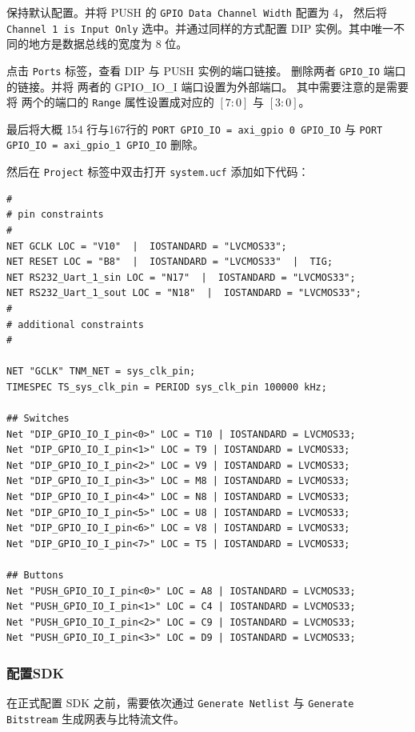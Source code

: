 \documentclass{ctexart}
\begin{document}
        保持默认配置。并将 PUSH 的 \verb|GPIO Data Channel Width| 配置为 4，
        然后将 \verb|Channel 1 is Input Only| 选中。并通过同样的方式配置 DIP
        实例。其中唯一不同的地方是数据总线的宽度为 8 位。

        点击 \verb|Ports| 标签，查看 DIP 与 PUSH 实例的端口链接。
        删除两者 \verb|GPIO_IO| 端口的链接。并将 两者的 GPIO_IO_I 端口设置为外部端口。
        其中需要注意的是需要将 两个的端口的 \verb|Range| 属性设置成对应的 
        $[7:0]$ 与 $[3:0]$。

        最后将大概 154 行与167行的
        \lstinline|PORT GPIO_IO = axi_gpio 0 GPIO_IO| 与
        \lstinline|PORT GPIO_IO = axi_gpio_1 GPIO_IO| 删除。

        然后在 \verb|Project| 标签中双击打开 \verb|system.ucf| 
        添加如下代码：
        
\begin{lstlisting}
#
# pin constraints
#
NET GCLK LOC = "V10"  |  IOSTANDARD = "LVCMOS33";
NET RESET LOC = "B8"  |  IOSTANDARD = "LVCMOS33"  |  TIG;
NET RS232_Uart_1_sin LOC = "N17"  |  IOSTANDARD = "LVCMOS33";
NET RS232_Uart_1_sout LOC = "N18"  |  IOSTANDARD = "LVCMOS33";
#
# additional constraints
#

NET "GCLK" TNM_NET = sys_clk_pin;
TIMESPEC TS_sys_clk_pin = PERIOD sys_clk_pin 100000 kHz;

## Switches
Net "DIP_GPIO_IO_I_pin<0>" LOC = T10 | IOSTANDARD = LVCMOS33;
Net "DIP_GPIO_IO_I_pin<1>" LOC = T9 | IOSTANDARD = LVCMOS33;
Net "DIP_GPIO_IO_I_pin<2>" LOC = V9 | IOSTANDARD = LVCMOS33;
Net "DIP_GPIO_IO_I_pin<3>" LOC = M8 | IOSTANDARD = LVCMOS33;
Net "DIP_GPIO_IO_I_pin<4>" LOC = N8 | IOSTANDARD = LVCMOS33;
Net "DIP_GPIO_IO_I_pin<5>" LOC = U8 | IOSTANDARD = LVCMOS33;
Net "DIP_GPIO_IO_I_pin<6>" LOC = V8 | IOSTANDARD = LVCMOS33;
Net "DIP_GPIO_IO_I_pin<7>" LOC = T5 | IOSTANDARD = LVCMOS33;

## Buttons
Net "PUSH_GPIO_IO_I_pin<0>" LOC = A8 | IOSTANDARD = LVCMOS33;
Net "PUSH_GPIO_IO_I_pin<1>" LOC = C4 | IOSTANDARD = LVCMOS33;
Net "PUSH_GPIO_IO_I_pin<2>" LOC = C9 | IOSTANDARD = LVCMOS33; 
Net "PUSH_GPIO_IO_I_pin<3>" LOC = D9 | IOSTANDARD = LVCMOS33;
\end{lstlisting}

        \subsubsection{配置SDK}
        
        在正式配置 SDK 之前，需要依次通过 
        \verb|Generate Netlist| 与 \verb|Generate Bitstream|
        生成网表与比特流文件。
        
\end{document}
